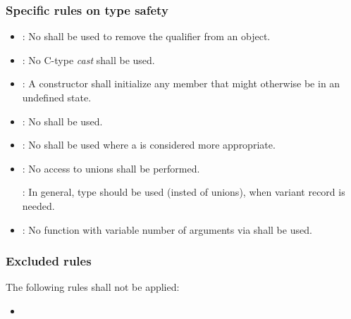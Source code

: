 \subsubsection{Specific rules on type safety}

\begin{itemize}

\item {}:
No  shall be used to remove the  qualifier
from an object.

\item {}:
No C-type \emph{cast} shall be used.

\item {}:
A constructor shall initialize any member that might otherwise be in an undefined state.

\item {}:
No  shall be used.

\item {}:
No  shall be used where
a  is considered more appropriate.

\item {}:
No access to unions shall be performed.

: 
In general, type  should be used (insted of unions),
when variant record is needed.

\item {}:
No function with variable number of arguments via
 shall be used.

\end{itemize}

\subsubsection{Excluded rules}

The following rules shall not be applied:


\begin{itemize}

\item {}

\end{itemize}

